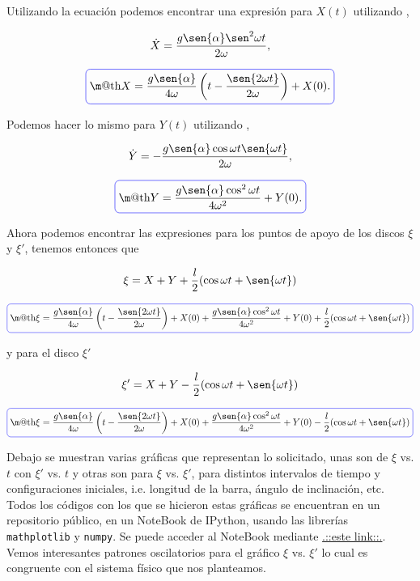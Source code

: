 \documentclass[a4paper,10pt]{article}
\makeatletter
\numberwithin{equation}{section}
\newcommand*{\boxcolor}{blue}
\renewcommand{\boxed}[1]{\textcolor{\boxcolor}{%
\tikz[baseline={([yshift=-1ex]current bounding box.center)}] \node [rectangle, minimum width=1ex,rounded corners,draw] {\normalcolor\m@th$\displaystyle#1$};}}
\makeatother
\begin{document}
Utilizando la ecuación  podemos encontrar una expresión para $X(t)$ utilizando  
,

\begin{equation}
 \dot{X} = \frac{g\sen{\alpha}\sen^2{\omega t}}{2\omega},
\end{equation}

\begin{equation}
 \boxed{X = \frac{g\sen{\alpha}}{4\omega}\left(t - \frac{\sen{2\omega t}}{2\omega}\right) + X(0) .}
\end{equation}

Podemos hacer lo mismo para $Y(t)$ utilizando ,

\begin{equation}
 \dot{Y} = - \frac{g\sen{\alpha}\cos{\omega t}\sen{\omega t}}{2\omega},
\end{equation}

\begin{equation}
 \boxed{Y = \frac{g\sen{\alpha}\cos^2{\omega t}}{4\omega^2} + Y(0).}
\end{equation}

Ahora podemos encontrar las expresiones para los puntos de apoyo de los discos 
$\xi$ y $\xi'$, tenemos entonces que 

\begin{equation}
 \xi = X + Y + \frac{l}{2}(\cos{\omega t} + \sen{\omega t})
\end{equation}

\begin{equation}
 \boxed{\xi = \frac{g\sen{\alpha}}{4\omega}\left(t - \frac{\sen{2\omega t}}{2\omega} \right) + X(0) 
 + \frac{g\sen{\alpha}\cos^2{\omega t}}{4\omega^2} + Y(0) + 
 \frac{l}{2}(\cos{\omega t} + \sen{\omega t})}
\end{equation}

y para el disco $\xi'$ 

\begin{equation}
  \xi' = X + Y - \frac{l}{2}(\cos{\omega t} + \sen{\omega t})
\end{equation}

\begin{equation}
 \boxed{\xi = \frac{g\sen{\alpha}}{4\omega}\left(t - \frac{\sen{2\omega t}}{2\omega} \right) + X(0) 
 + \frac{g\sen{\alpha}\cos^2{\omega t}}{4\omega^2} + Y(0) - 
 \frac{l}{2}(\cos{\omega t} + \sen{\omega t})}
\end{equation}

Debajo se muestran varias gráficas que representan lo solicitado, unas son de $\xi$ vs. $t$ con 
$\xi'$ vs. $t$ y otras son para $\xi$ vs. $\xi'$, para distintos intervalos de tiempo y 
configuraciones iniciales, i.e. longitud de la barra, ángulo de inclinación, etc. Todos 
los códigos con los que se hicieron estas gráficas se encuentran en un repositorio público,
en un NoteBook de IPython, usando las librerías \texttt{mathplotlib} y \texttt{numpy}. Se 
puede acceder al NoteBook mediante \href{https://github.com/FavioVazquez/MecanicaClasica-PCF/blob/master/Tarea7/Problema1.ipynb}{\color{blue}.::este link::.}.
Vemos interesantes patrones oscilatorios para el gráfico $\xi$ vs. $\xi'$ lo cual es 
congruente con el sistema físico que nos planteamos.
\end{document}
